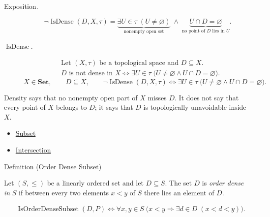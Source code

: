\begin{remark*}
\begin{description}
\item[Exposition.]
\[
\neg\operatorname{IsDense}(D,X,\tau)
=
\underbrace{\exists U\in\tau\;(U\neq\varnothing)}_{\text{nonempty open set}}
\;\land\;
\underbrace{U\cap D=\varnothing}_{\text{no point of }D\text{ lies in }U}.
\]


  \item[\(\operatorname{IsDense}.\)]
  \[
\begin{aligned}
&\text{Let }(X,\tau)\text{ be a topological space and }D\subseteq X.\\
&D\text{ is not dense in }X
\Longleftrightarrow
\exists U\in\tau\;\bigl(U\neq\varnothing\land U\cap D=\varnothing\bigr).
\end{aligned}
\]
\[
X\in\mathbf{Set},\qquad D\subseteq X,\qquad
\neg\operatorname{IsDense}(D,X,\tau)\Longleftrightarrow
\exists U\in\tau\;\bigl(U\neq\varnothing\land U\cap D=\varnothing\bigr).
\]
\end{description}
\end{remark*}

\begin{remark*}[Interpretation]
Density says that no nonempty open part of $X$ misses $D$.  It does not
say that every point of $X$ belongs to $D$; it says that $D$ is
topologically unavoidable inside $X$.
\end{remark*}

\begin{dependencies}
\begin{itemize}
  \item \hyperref[def:subset]{Subset}
  \item \hyperref[def:intersection]{Intersection}
\end{itemize}
\end{dependencies}

\begin{definitionbox}{Definition (Order Dense Subset)}
\begin{definition}
\label{def:order-dense-subset}
Let $(S,\leq)$ be a linearly ordered set and let $D\subseteq S$.  The set
$D$ is \emph{order dense in} $S$ if between every two elements $x<y$ of
$S$ there lies an element of $D$.
\end{definition}
\end{definitionbox}

\begin{remark*}
\[
\begin{aligned}
&\operatorname{IsOrderDenseSubset}(D,P)
\Longleftrightarrow
\forall x,y\in S\;\bigl(x<y\Longrightarrow \exists d\in D\;(x<d<y)\bigr).
\end{aligned}
\]
\end{remark*}

